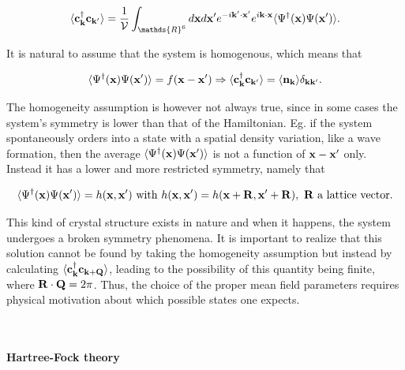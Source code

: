 \documentclass{homework}
\begin{document}
\begin{equation}
    \langle {\bf c}_{{\bf k}}^\dagger {\bf c}_{{\bf k}'} \rangle = \frac{1}{\mathcal{V}} \int_{\mathds{R}^6} d{\bf x} d{\bf x}' e^{-i {\bf k}' \cdot {\bf x}'} e^{i {\bf k} \cdot {\bf x}} \langle \Psi^\dagger({\bf x}) \Psi({\bf x}') \rangle.
\end{equation}

It is natural to assume that the system is homogenous, which means that 

\begin{equation}
    \langle \Psi^\dagger({\bf x}) \Psi({\bf x}') \rangle = f({\bf x} - {\bf x}') \Rightarrow \langle {\bf c}_{{\bf k}}^\dagger {\bf c}_{{\bf k}'} \rangle = \langle {\bf n}_{\bf k} \rangle \delta_{{\bf k}{\bf k}'}.
\end{equation}

The homogeneity assumption is however not always true, since in some cases the system's symmetry is lower than that of the Hamiltonian. Eg. if the system spontaneously orders into a state with a spatial density variation, like a wave formation, then the average $\langle \Psi^\dagger({\bf x}) \Psi({\bf x}') \rangle$ is not a function of ${\bf x} - {\bf x}'$ only. Instead it has a lower and more restricted symmetry, namely that 

$$
    \langle \Psi^\dagger({\bf x}) \Psi({\bf x}') \rangle = h({\bf x}, {\bf x}') \textnormal{ with } h({\bf x}, {\bf x}') = h({\bf x} + {\bf R}, {\bf x}' + {\bf R}), \textnormal{ ${\bf R}$ a lattice vector}.
$$

\begin{tcolorbox}[colback = yellow, title = Physical Context]

This kind of crystal structure exists in nature and when it happens, the system undergoes a broken symmetry phenomena. It is important to realize that this solution cannot be found by taking the homogeneity assumption but instead by calculating $ \langle {\bf c}_{{\bf k}}^\dagger {\bf c}_{{\bf k} + {\bf Q}} \rangle$, leading to the possibility of this quantity being finite, where ${\bf R} \cdot {\bf Q} = 2\pi$. Thus, the choice of the proper mean field parameters requires physical motivation about which possible states one expects. 

\end{tcolorbox}

\blanky \\

\paragraph{\textbf{Hartree-Fock theory}}
\end{document}
